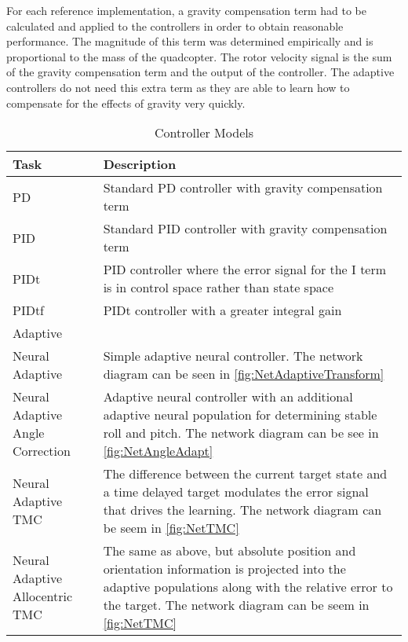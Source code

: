\documentclass[letterpaper,12pt,titlepage,oneside,final]{book}
\begin{document}

For each reference implementation, a gravity compensation term had to be calculated and applied to the controllers in order to obtain reasonable performance. 
The magnitude of this term was determined empirically and is proportional to the mass of the quadcopter. 
The rotor velocity signal is the sum of the gravity compensation term and the output of the controller.
The adaptive controllers do not need this extra term as they are able to learn how to compensate for the effects of gravity very quickly.

\begin{table}
\caption{Controller Models} \label{table:controller_models}
\begin{center}
\begin{tabular}{| l | p{9cm} |}

\hline
\textbf{Task} & \textbf{Description} \\ \hline
PD & Standard PD controller with gravity compensation term \\ \hline
PID & Standard PID controller with gravity compensation term \\ \hline
PIDt & PID controller where the error signal for the I term is in control space rather than state space \\ \hline
PIDtf & PIDt controller with a greater integral gain \\ \hline
Adaptive &  \\ \hline %
Neural Adaptive & Simple adaptive neural controller. The network diagram can be seen in \autoref{fig:NetAdaptiveTransform} \\ \hline
Neural Adaptive Angle Correction & Adaptive neural controller with an additional adaptive neural population for determining stable roll and pitch. The network diagram can be see in \autoref{fig:NetAngleAdapt} \\ \hline
Neural Adaptive TMC & The difference between the current target state and a time delayed target modulates the error signal that drives the learning. The network diagram can be seem in \autoref{fig:NetTMC} \\ \hline
Neural Adaptive Allocentric TMC & The same as above, but absolute position and orientation information is projected into the adaptive populations along with the relative error to the target. The network diagram can be seem in \autoref{fig:NetTMC} \\ \hline

\end{tabular}
\end{center}
\end{table}
\end{document}
